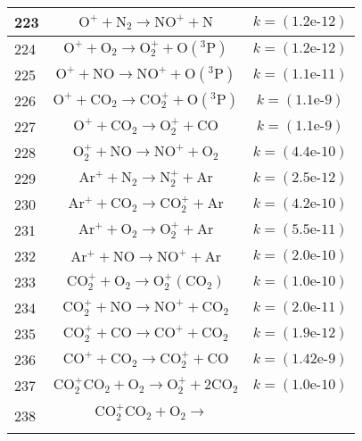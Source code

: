 \begin{longtable}{| m{} | m{}| m{} |}
\hline
 223 & $$ \mathrm{O^+} + \mathrm{N_2}\longrightarrow \mathrm{NO^+} + \mathrm{N} $$ & $$k = (\textrm{1.2e-12}) $$ \\
\hline
 224 & $$ \mathrm{O^+} + \mathrm{O_2}\longrightarrow \mathrm{O_2^+} + \mathrm{O(^3P)} $$ & $$k = (\textrm{1.2e-12}) $$ \\
\hline
 225 & $$ \mathrm{O^+} + \mathrm{NO}\longrightarrow \mathrm{NO^+} + \mathrm{O(^3P)} $$ & $$k = (\textrm{1.1e-11}) $$ \\
\hline
 226 & $$ \mathrm{O^+} + \mathrm{CO_2}\longrightarrow \mathrm{CO_2^+} + \mathrm{O(^3P)} $$ & $$k = (\textrm{1.1e-9}) $$ \\
\hline
 227 & $$ \mathrm{O^+} + \mathrm{CO_2}\longrightarrow \mathrm{O_2^+} + \mathrm{CO} $$ & $$k = (\textrm{1.1e-9}) $$ \\
\hline
 228 & $$ \mathrm{O_2^+} + \mathrm{NO}\longrightarrow \mathrm{NO^+} + \mathrm{O_2} $$ & $$k = (\textrm{4.4e-10}) $$ \\
\hline
 229 & $$ \mathrm{Ar^+} + \mathrm{N_2}\longrightarrow \mathrm{N_2^+} + \mathrm{Ar} $$ & $$k = (\textrm{2.5e-12}) $$ \\
\hline
 230 & $$ \mathrm{Ar^+} + \mathrm{CO_2}\longrightarrow \mathrm{CO_2^+} + \mathrm{Ar} $$ & $$k = (\textrm{4.2e-10}) $$ \\
\hline
 231 & $$ \mathrm{Ar^+} + \mathrm{O_2}\longrightarrow \mathrm{O_2^+} + \mathrm{Ar} $$ & $$k = (\textrm{5.5e-11}) $$ \\
\hline
 232 & $$ \mathrm{Ar^+} + \mathrm{NO}\longrightarrow \mathrm{NO^+} + \mathrm{Ar} $$ & $$k = (\textrm{2.0e-10}) $$ \\
\hline
 233 & $$ \mathrm{CO_2^+} + \mathrm{O_2}\longrightarrow \mathrm{O_2^+(CO_2)} $$ & $$k = (\textrm{1.0e-10}) $$ \\
\hline
 234 & $$ \mathrm{CO_2^+} + \mathrm{NO}\longrightarrow \mathrm{NO^+} + \mathrm{CO_2} $$ & $$k = (\textrm{2.0e-11}) $$ \\
\hline
 235 & $$ \mathrm{CO_2^+} + \mathrm{CO}\longrightarrow \mathrm{CO^+} + \mathrm{CO_2} $$ & $$k = (\textrm{1.9e-12}) $$ \\
\hline
 236 & $$ \mathrm{CO^+} + \mathrm{CO_2}\longrightarrow \mathrm{CO_2^+} + \mathrm{CO} $$ & $$k = (\textrm{1.42e-9}) $$ \\
\hline
 237 & $$ \mathrm{CO_2^+CO_2} + \mathrm{O_2}\longrightarrow \mathrm{O_2^+} + 2\mathrm{CO_2} $$ & $$k = (\textrm{1.0e-10}) $$ \\
\hline
 238 & $$
\begin{aligned}
&\mathrm{CO_2^+CO_2} + \mathrm{O_2} \longrightarrow \\

\end{aligned}$$
\end{longtable}
